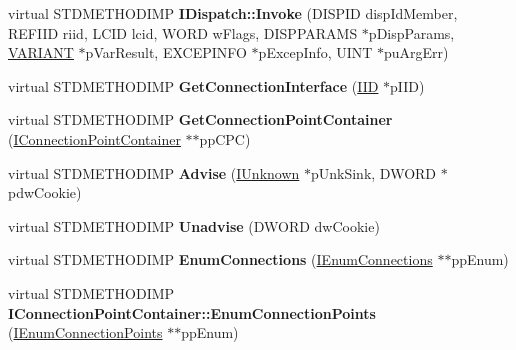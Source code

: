 \begin{DoxyCompactItemize}
\mbox{\label{class_s_e_a_l_e_d___a84d55dcdec59ac1a73afc58c8cca3ae5}} 
virtual S\+T\+D\+M\+E\+T\+H\+O\+D\+I\+MP {\bfseries I\+Dispatch\+::\+Invoke} (D\+I\+S\+P\+ID disp\+Id\+Member, R\+E\+F\+I\+ID riid, L\+C\+ID lcid, W\+O\+RD w\+Flags, D\+I\+S\+P\+P\+A\+R\+A\+MS $\ast$p\+Disp\+Params, \hyperlink{structtag_v_a_r_i_a_n_t}{V\+A\+R\+I\+A\+NT} $\ast$p\+Var\+Result, E\+X\+C\+E\+P\+I\+N\+FO $\ast$p\+Excep\+Info, U\+I\+NT $\ast$pu\+Arg\+Err)
\item 
\mbox{\label{class_s_e_a_l_e_d___ad97bb5c8bedd23757539b77b5a206b35}} 
virtual S\+T\+D\+M\+E\+T\+H\+O\+D\+I\+MP {\bfseries Get\+Connection\+Interface} (\hyperlink{struct___i_i_d}{I\+ID} $\ast$p\+I\+ID)
\item 
\mbox{\label{class_s_e_a_l_e_d___ac1d63b65f660a56b2cffa3f9560a3959}} 
virtual S\+T\+D\+M\+E\+T\+H\+O\+D\+I\+MP {\bfseries Get\+Connection\+Point\+Container} (\hyperlink{interface_i_connection_point_container}{I\+Connection\+Point\+Container} $\ast$$\ast$pp\+C\+PC)
\item 
\mbox{\label{class_s_e_a_l_e_d___aaf8ee02363fe120ee45e844bffa2009e}} 
virtual S\+T\+D\+M\+E\+T\+H\+O\+D\+I\+MP {\bfseries Advise} (\hyperlink{interface_i_unknown}{I\+Unknown} $\ast$p\+Unk\+Sink, D\+W\+O\+RD $\ast$pdw\+Cookie)
\item 
\mbox{\label{class_s_e_a_l_e_d___a40be4b4e53c915c30a026ccda1c45fa9}} 
virtual S\+T\+D\+M\+E\+T\+H\+O\+D\+I\+MP {\bfseries Unadvise} (D\+W\+O\+RD dw\+Cookie)
\item 
\mbox{\label{class_s_e_a_l_e_d___a11ffaaf6dc1dcd004741f173bb02e4bd}} 
virtual S\+T\+D\+M\+E\+T\+H\+O\+D\+I\+MP {\bfseries Enum\+Connections} (\hyperlink{interface_i_enum_connections}{I\+Enum\+Connections} $\ast$$\ast$pp\+Enum)
\item 
\mbox{\label{class_s_e_a_l_e_d___a879b580241c64c62e270b76736cac7db}} 
virtual S\+T\+D\+M\+E\+T\+H\+O\+D\+I\+MP {\bfseries I\+Connection\+Point\+Container\+::\+Enum\+Connection\+Points} (\hyperlink{interface_i_enum_connection_points}{I\+Enum\+Connection\+Points} $\ast$$\ast$pp\+Enum)
\item 
\mbox{\label{class_s_e_a_l_e_d___ac2f35e203d67c70f37ce36dfd3111221}} 
$$
\end{DoxyCompactItemize}
